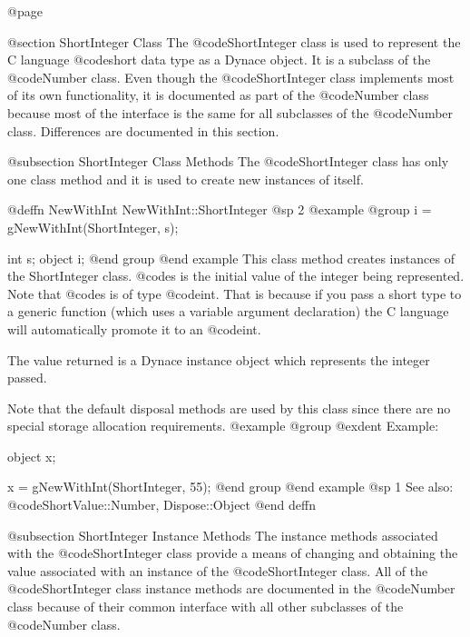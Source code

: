 @page

@section ShortInteger Class
The @code{ShortInteger} class is used to represent the C language
@code{short} data type as a Dynace object.  It is a subclass of the
@code{Number} class.  Even though the @code{ShortInteger} class
implements most of its own functionality, it is documented as part of
the @code{Number} class because most of the interface is the same for
all subclasses of the @code{Number} class.  Differences are documented
in this section.


@subsection ShortInteger Class Methods
The @code{ShortInteger} class has only one class method and it is used
to create new instances of itself.



@deffn {NewWithInt} NewWithInt::ShortInteger
@sp 2
@example
@group
i = gNewWithInt(ShortInteger, s);

int     s;
object  i;
@end group
@end example
This class method creates instances of the ShortInteger class.  @code{s}
is the initial value of the integer being represented.  Note that
@code{s} is of type @code{int}.  That is because if you pass a short
type to a generic function (which uses a variable argument declaration)
the C language will automatically promote it to an @code{int}.

The value returned is a Dynace instance object which represents the integer
passed.

Note that the default disposal methods are used by this class since
there are no special storage allocation requirements.
@example
@group
@exdent Example:

object  x;

x = gNewWithInt(ShortInteger, 55);
@end group
@end example
@sp 1
See also:  @code{ShortValue::Number, Dispose::Object}
@end deffn





@subsection ShortInteger Instance Methods
The instance methods associated with the @code{ShortInteger} class
provide a means of changing and obtaining the value associated with an
instance of the @code{ShortInteger} class.  All of the
@code{ShortInteger} class instance methods are documented in the
@code{Number} class because of their common interface with all other
subclasses of the @code{Number} class.















